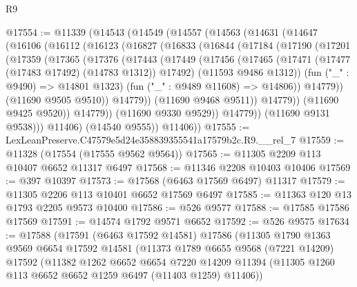 \begin{lexlean}{R9}
\begin{coremodule}
@17554 := @11339
    (@14543
      (@14549
        (@14557
          (@14563
            (@14631
              (@14647
                (@16106
                  (@16112
                    (@16123
                      (@16827
                        (@16833
                          (@16844
                            (@17184
                              (@17190
                                (@17201
                                  (@17359
                                    (@17365
                                      (@17376
                                        (@17443
                                          (@17449
                                            (@17456
                                              (@17465
                                                (@17471
                                                  (@17477 (@17483 @17492) (@14783 @1312))
                                                  @17492)
                                                (@11593 @9486 @1312))
                                              (fun ("_" : @9490) => @14801 @1323)
                                              (fun ("_" : @9489 @11608) => @14806))
                                            @14779))
                                        (@11690 @9505 @9510))
                                      @14779))
                                  (@11690 @9468 @9511))
                                @14779))
                            (@11690 @9425 @9520))
                          @14779))
                      (@11690 @9330 @9529))
                    @14779))
                (@11690 @9131 @9538)))
            @11406)
          (@14540 @9555))
        @11406))
@17555 := LexLeanPreserve.C47579e5d24e358839355541a17579b2c.R9.__rel_7
@17559 := @11328 (@17554 (@17555 @9562 @9564))
@17565 := @11305 @2209 @113 @10407 @6652 @11317 @6497
@17568 := @11346 @2208 @10403 @10406
@17569 := @397 @10397
@17573 := @17568 (@6463 @17569 @6497) @11317
@17579 := @11305 @2206 @113 @10401 @6652 @17569 @6497
@17585 := @11363 @120 @13 @1793 @2205 @9573 @10400
@17586 := @526 @9577
@17588 := @17585 @17586 @17569
@17591 := @14574 @1792 @9571 @6652
@17592 := @526 @9575
@17634 := @17588
    (@17591
      (@6463 @17592 @14581)
      @17586
      (@11305
        @1790
        @1363
        @9569
        @6654
        @17592
        @14581
        (@11373
          @1789
          @6655
          @9568
          (@7221 @14209)
          @17592
          (@11382
            @1262
            @6652
            @6654
            @7220
            @14209
            @11394
            (@11305 @1260 @113 @6652 @6652 @1259 @6497 (@11403 @1259) @11406))

\end{coremodule}
\end{lexlean}
